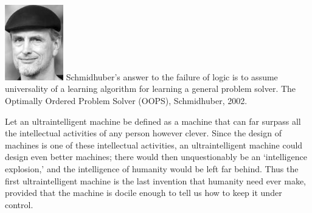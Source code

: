 {\vfill
\includegraphics[width= 1in]{../images/schmidhuber}
Schmidhuber's answer to the failure of logic is to assume universality of a learning algorithm for learning a general problem solver. The Optimally Ordered Problem Solver (OOPS), Schmidhuber, 2002.


Let an ultraintelligent machine be defined as a machine that can far surpass all the intellectual activities of any person however clever. Since the design of machines is one of these intellectual activities, an ultraintelligent machine could design even better machines; there would then unquestionably be an ‘intelligence explosion,’ and the intelligence of humanity would be left far behind. Thus the first ultraintelligent machine is the last invention that humanity need ever make, provided that the machine is docile enough to tell us how to keep it under control.

\vfill
{}


}


